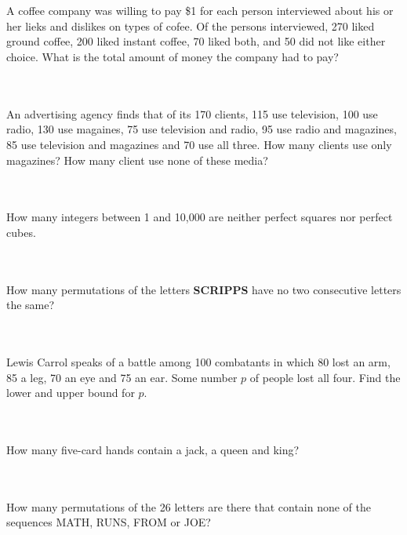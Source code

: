\documentclass[12pt,letterpaper,boxed]{hmcpset}
\DeclarePairedDelimiter\\floor{\\lfloor}{\\rfloor}
\begin{document}
\begin{problem}[Shahriari 8.1.1][20]\\
\\
A coffee company was willing to pay \$1 for each person interviewed about his or her lieks and dislikes on types of cofee. Of the persons interviewed, 270 liked ground coffee, 200 liked instant coffee, 70 liked both, and 50 did not like either choice. What is the total amount of money the company had to pay?

\end{problem}
\begin{problem}[Shahriari 8.1.3][20]\\
\\
An advertising agency finds that of its 170 clients, 115 use television, 100 use radio, 130 use magaines, 75 use television and radio, 95 use radio and magazines, 85 use television and magazines and 70 use all three. How many clients use only magazines? How many client use none of these media?

\end{problem}
\begin{problem}[Shahriari 8.1.4][20]\\
\\
How many integers between 1 and 10,000 are neither perfect squares nor perfect cubes.

\end{problem}
\begin{problem}[Shahriari 8.1.6][20]\\
\\
How many permutations of the letters \textbf{SCRIPPS} have no two consecutive letters the same?

\end{problem}
\begin{problem}[Shahriari 8.1.8][20]\\
\\
Lewis Carrol speaks of a battle among 100 combatants in which 80 lost an arm, 85 a leg, 70 an eye and 75 an ear. Some number $p$ of people lost all four. Find the lower and upper bound for $p$.

\end{problem}
\begin{problem}[Shahriari 8.1.10][20]\\
\\
How many five-card hands contain a jack, a queen and king?

\end{problem}
\begin{problem}[Shahriari 8.1.14][20]\\
\\
How many permutations of the 26 letters are there that contain none of the sequences MATH, RUNS, FROM or JOE?

\end{problem}
\end{document}
